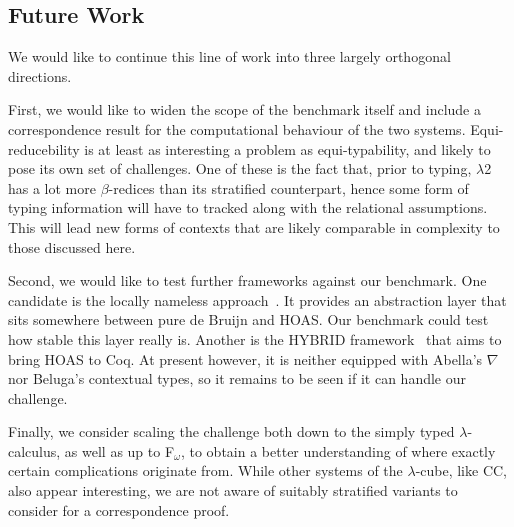 \documentclass[a4paper,UKenglish]{lipics-v2016}
\newcommand{\SysL}{$\lambda$2\xspace}
\theoremstyle{plain}
\begin{document}
\subsection{Future Work}
\label{sec:future-work}

We would like to continue this line of work into three largely orthogonal directions.

First, we would like to widen the scope of the benchmark itself and include a correspondence result for the computational behaviour of the two systems.
Equi-reducebility is at least as interesting a problem as equi-typability, and likely to pose its own set of challenges.
One of these is the fact that, prior to typing, \SysL has a lot more $\beta$-redices than its stratified counterpart, hence some form of typing information will have to tracked along with the relational assumptions.
This will lead new forms of contexts that are likely comparable in complexity to those discussed here.

Second, we would like to test further frameworks against our benchmark.
One candidate is the locally nameless approach~\cite{DBLP:conf/popl/AydemirCPPW08}.
It provides an abstraction layer that sits somewhere between pure de Bruijn and HOAS.
Our benchmark could test how stable this layer really is.
Another is the HYBRID framework~\cite{Capretta2007, Capretta2009, DBLP:journals/jar/FeltyM12} that aims to bring HOAS to Coq.
At present however, it is neither equipped with Abella's $\nabla$ nor Beluga's contextual types, so it remains to be seen if it can handle our challenge.

Finally, we consider scaling the challenge both down to the simply typed $\lambda$-calculus, as well as up to F$_\omega$, to obtain a better understanding of where exactly certain complications originate from.
While other systems of the $\lambda$-cube, like CC, also appear interesting, we are not aware of suitably stratified variants to consider for a correspondence proof.








 
\end{document}
